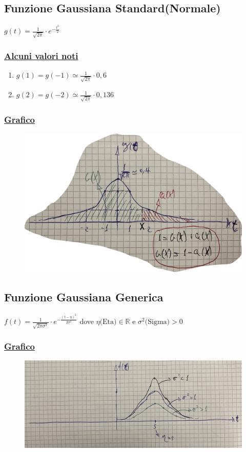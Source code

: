\documentclass{article}
\begin{document}
\subsection{Funzione Gaussiana Standard(Normale)}
$g(t) = \frac{1}{\sqrt{2 \pi}} \cdot e^{-\frac{t^2}{2}}$

\subsubsection{\underline{Alcuni valori noti}}
\begin{enumerate}
    \item $g(1) = g(-1) \simeq \frac{1}{\sqrt{2 \pi}}\cdot 0,6$
    \item $g(2) = g(-2) \simeq \frac{1}{\sqrt{2 \pi}}\cdot 0,136$
\end{enumerate}
\subsubsection{\underline{Grafico}}
\begin{figure}[ht]
\centering
\includegraphics[scale=0.13]{6.Gauss.jpeg}
\end{figure} 
\newpage
\subsection{Funzione Gaussiana Generica}
$f(t) = \frac{1}{\sqrt{2 \pi \sigma^2}} \cdot e^{-\frac{(t- \eta)^2}{2 \sigma^2}}$ dove $\eta \text{(Eta)} \in \mathbb{R}$ e $\sigma^2\text{(Sigma)} > 0$
\subsubsection{\underline{Grafico}}
\begin{figure}[ht]
\centering
\includegraphics[scale=0.15]{7.Gauss2.jpeg}
\end{figure}
\end{document}
